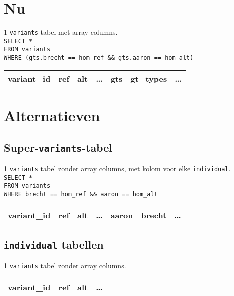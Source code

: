 \documentclass{article}
\begin{document}
\section{Nu}

1 \texttt{variants} tabel met array columns.\\

\texttt{SELECT * \\FROM variants \\WHERE (gts.brecht == hom\_ref \&\& gts.aaron == hom\_alt)}
\begin{table}[h]
\begin{tabular}{@{}|l|l|l|l|l|l|l|@{}}
\toprule
variant\_id & ref & alt & \ldots & gts & gt\_types & \ldots \\ \bottomrule
\end{tabular}
\end{table}

\section{Alternatieven}

\subsection{Super-\texttt{variants}-tabel}

1 \texttt{variants} tabel zonder array columns, met kolom voor elke \texttt{individual}.\\

\texttt{SELECT * \\
FROM variants \\
WHERE brecht == hom\_ref \&\& aaron == hom\_alt}
\begin{table}[!htbp]
\begin{tabular}{@{}|l|l|l|l|l|l|l|@{}}
\toprule
variant\_id & ref & alt & \ldots & aaron & brecht & \ldots \\ \bottomrule
\end{tabular}
\end{table}

\subsection{\texttt{individual} tabellen} 

1 \texttt{variants} tabel zonder array columns.

\begin{table}[!htbp]
\begin{tabular}{@{}|l|l|l|l|@{}}
\toprule
variant\_id & ref & alt & \ldots \\ \bottomrule
\end{tabular}
\end{table}
\end{document}
